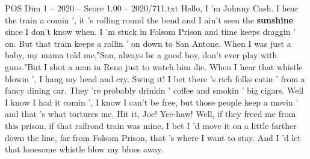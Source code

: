 \begin{textsample}{POS Dim 1 – 2020 – Score 1.00 – 2020/711.txt}  \label{ex:f1_pos_006}
Hello, I 'm Johnny Cash.
I hear the train a comin ', it 's rolling round the bend and I ain't seen the \textbf{sunshine} since I don't know when.
I 'm stuck in Folsom Prison and time keeps draggin ' on.
But that train keeps a rollin ' on down to San Antone.
When I was just a baby, my mama told me,"Son, always be a good boy, don't ever play with guns."But I shot a man in Reno just to watch him die.
When I hear that whistle blowin ', I hang my head and cry.
Swing it!
I bet there 's rich folks eatin ' from a fancy dining car.
They 're probably drinkin ' coffee and smokin ' big cigars.
Well I know I had it comin ', I know I can't be free, but those people keep a movin ' and that 's what tortures me.
Hit it, Joe!
Yee-haw!
Well, if they freed me from this prison, if that railroad train was mine, I bet I 'd move it on a little farther down the line, far from Folsom Prison, that 's where I want to stay.
And I 'd let that lonesome whistle blow my blues away.

\end{textsample}
